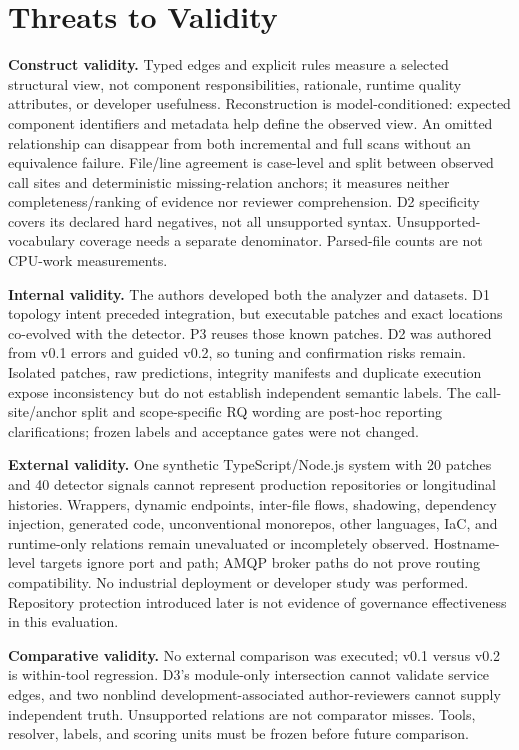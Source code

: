 \section{Threats to Validity}

\textbf{Construct validity.}
Typed edges and explicit rules measure a selected structural view, not component responsibilities, rationale, runtime quality attributes, or developer usefulness. Reconstruction is model-conditioned: expected component identifiers and metadata help define the observed view. An omitted relationship can disappear from both incremental and full scans without an equivalence failure. File/line agreement is case-level and split between observed call sites and deterministic missing-relation anchors; it measures neither completeness/ranking of evidence nor reviewer comprehension. D2 specificity covers its declared hard negatives, not all unsupported syntax. Unsupported-vocabulary coverage needs a separate denominator. Parsed-file counts are not CPU-work measurements.

\textbf{Internal validity.}
The authors developed both the analyzer and datasets. D1 topology intent preceded integration, but executable patches and exact locations co-evolved with the detector. P3 reuses those known patches. D2 was authored from v0.1 errors and guided v0.2, so tuning and confirmation risks remain. Isolated patches, raw predictions, integrity manifests and duplicate execution expose inconsistency but do not establish independent semantic labels. The call-site/anchor split and scope-specific RQ wording are post-hoc reporting clarifications; frozen labels and acceptance gates were not changed.

\textbf{External validity.}
One synthetic TypeScript/Node.js system with 20 patches and 40 detector signals cannot represent production repositories or longitudinal histories. Wrappers, dynamic endpoints, inter-file flows, shadowing, dependency injection, generated code, unconventional monorepos, other languages, IaC, and runtime-only relations remain unevaluated or incompletely observed. Hostname-level targets ignore port and path; AMQP broker paths do not prove routing compatibility. No industrial deployment or developer study was performed. Repository protection introduced later is not evidence of governance effectiveness in this evaluation.

\textbf{Comparative validity.}
No external comparison was executed; v0.1 versus v0.2 is within-tool regression. D3's module-only intersection cannot validate service edges, and two nonblind development-associated author-reviewers cannot supply independent truth. Unsupported relations are not comparator misses. Tools, resolver, labels, and scoring units must be frozen before future comparison.

